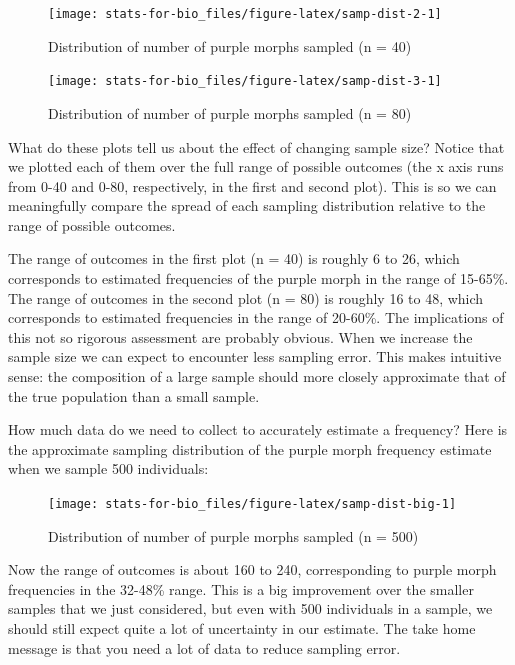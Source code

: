 \documentclass[]{book}
\begin{document}
\begin{figure}

{\centering \texttt{[image: stats-for-bio\_files/figure-latex/samp-dist-2-1]} 

}

\caption{Distribution of number of purple morphs sampled (n = 40)}\label{fig:samp-dist-2}
\end{figure}

\begin{figure}

{\centering \texttt{[image: stats-for-bio\_files/figure-latex/samp-dist-3-1]} 

}

\caption{Distribution of number of purple morphs sampled (n = 80)}\label{fig:samp-dist-3}
\end{figure}

What do these plots tell us about the effect of changing sample size?
Notice that we plotted each of them over the full range of possible
outcomes (the x axis runs from 0-40 and 0-80, respectively, in the first
and second plot). This is so we can meaningfully compare the spread of
each sampling distribution relative to the range of possible outcomes.

The range of outcomes in the first plot (n = 40) is roughly 6 to 26,
which corresponds to estimated frequencies of the purple morph in the
range of 15-65\%. The range of outcomes in the second plot (n = 80) is
roughly 16 to 48, which corresponds to estimated frequencies in the
range of 20-60\%. The implications of this not so rigorous assessment
are probably obvious. When we increase the sample size we can expect to
encounter less sampling error. This makes intuitive sense: the
composition of a large sample should more closely approximate that of
the true population than a small sample.

How much data do we need to collect to accurately estimate a frequency?
Here is the approximate sampling distribution of the purple morph
frequency estimate when we sample 500 individuals:

\begin{figure}

{\centering \texttt{[image: stats-for-bio\_files/figure-latex/samp-dist-big-1]} 

}

\caption{Distribution of number of purple morphs sampled (n = 500)}\label{fig:samp-dist-big}
\end{figure}

Now the range of outcomes is about 160 to 240, corresponding to purple
morph frequencies in the 32-48\% range. This is a big improvement over
the smaller samples that we just considered, but even with 500
individuals in a sample, we should still expect quite a lot of
uncertainty in our estimate. The take home message is that you need a
lot of data to reduce sampling error.
\end{document}
